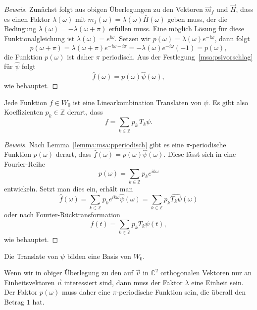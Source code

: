 \begin{proof}[Beweis]
Zunächst folgt aus obigen Überlegungen zu den Vektoren $\vec{m}_f$ und
$\vec{H}$, dass es einen Faktor $\lambda(\omega)$ mit
$m_f(\omega)=\lambda(\omega)\bar{H}(\omega)$ geben muss, der die
Bedingung $\lambda(\omega)=-\lambda(\omega+\pi)$ erfüllen muss.
Eine möglich Lösung für diese Funktionalgleichung ist
$\lambda(\omega)=e^{i\omega}$.
Setzen wir $p(\omega) = \lambda(\omega)e^{-i\omega}$, dann folgt
\[
p(\omega+\pi) = \lambda(\omega+\pi)e^{-i\omega-i\pi}
=-\lambda(\omega)e^{-i\omega} (-1) = p(\omega),
\]
die Funktion $p(\omega)$ ist daher $\pi$ periodisch.
Aus der Festlegung~\ref{msa:psivorschlag} für $\hat{\psi}$ folgt
\[
\hat{f}(\omega)= p(\omega)\hat{\psi}(\omega),
\]
wie behauptet.
\end{proof}

\begin{lemma}
Jede Funktion $f\in W_0$ ist eine Linearkombination Translaten von $\psi$.
Es gibt also Koeffizienten $p_k\in\mathbb Z$ derart, dass 
\[
f = \sum_{k\in\mathbb Z} p_k\,T_k\psi.
\]
\end{lemma}

\begin{proof}[Beweis]
Nach Lemma~\eqref{lemma:msa:pperiodisch} gibt es eine $\pi$-periodische
Funktion $p(\omega)$ derart, dass $\hat{f}(\omega)=p(\omega)\hat{\psi}(\omega)$.
Diese lässt sich in eine Fourier-Reihe 
\[
p(\omega) = \sum_{k\in\mathbb Z} p_k e^{ik\omega} 
\]
entwickeln.
Setzt man dies ein, erhält man
\[
\hat{f}(\omega)
=
\sum_{k\in\mathbb Z} p_k e^{ik\omega} \hat{\psi}(\omega)
=
\sum_{k\in\mathbb Z} p_k \widehat{T_k\psi}(\omega)
\]
oder nach Fourier-Rücktransformation
\[
f(t) = \sum_{k\in\mathbb Z} p_k T_k\psi(t),
\]
wie behauptet.
\end{proof}

\begin{lemma}
Die Translate von $\psi$ bilden eine Basis von $W_0$.
\end{lemma}

Wenn wir in obiger Überlegung zu den auf $\vec{v}$ in $\mathbb C^2$
orthogonalen Vektoren nur an Einheitsvektoren $\vec{u}$
interessiert sind,
dann muss der Faktor $\lambda$ eine Einheit sein.
Der Faktor $p(\omega)$ muss daher eine $\pi$-periodische Funktion
sein, die überall den Betrag $1$ hat.

%
%
